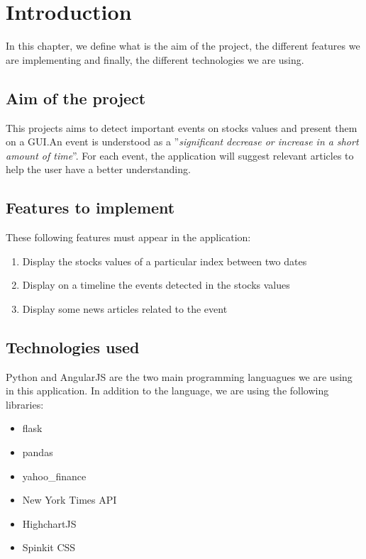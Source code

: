 \chapter{Introduction}
\label{chapter:introduction}
In this chapter, we define what is the aim of the project, the different features we are implementing and finally, the different technologies we are using.

\section{Aim of the project}
This projects aims to detect important events on stocks values and present them on a GUI.\@ An event is understood as a ''\textit{significant decrease or increase in a short amount of time}''. For each event, the application will suggest relevant articles to help the user have a better understanding.

\section{Features to implement}
\label{sec:intro:features}
These following features must appear in the application:
\begin{enumerate}
    \item Display the stocks values of a particular index between two dates
    \item Display on a timeline the events detected in the stocks values
    \item Display some news articles related to the event
\end{enumerate}

\section{Technologies used}
Python and AngularJS are the two main programming languagues we are using in this application. In addition to the language, we are using the following libraries:
\begin{itemize}
    \item flask
    \item pandas
    \item yahoo\_finance
    \item New York Times API
    \item HighchartJS
    \item Spinkit CSS
\end{itemize}
